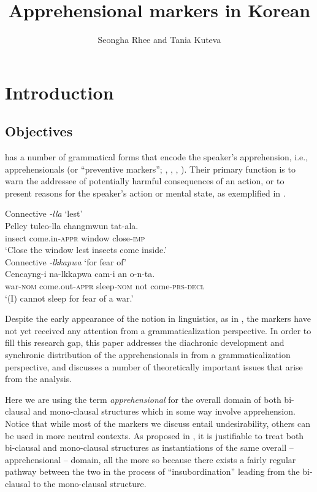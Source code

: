 \documentclass[output=paper,colorlinks,citecolor=brown]{langscibook}
\author{Seongha Rhee\affiliation{Mahidol University; Hankuk University of Foreign Studies} and Tania Kuteva\affiliation{Heinrich-Heine-Universität Düsseldorf; SOAS, University of London}}
\title{Apprehensional markers in Korean}
\begin{document}
\maketitle


\section{Introduction}
\label{sec:rhee:introduction}

\subsection{Objectives}
\label{subsec:objectives}

 has a number of grammatical forms that encode the speaker's apprehension, i.e., apprehensionals (or ``preventive markers''; \citealt{Ramstedt1997}, \citealt{Kim1960}, \citealt{Ko1989}, \citealt{Son1994}). Their primary function is to warn the addressee of potentially harmful consequences of an action, or to present reasons for the speaker's action or mental state, as exemplified in .


\ea \label{ex:RK1}
\ea \label{ex:RK1a} \textup{Connective} \textit{-lla} \textup{`lest'} \\
\gll Pelley tuleo-lla changmwun tat-ala. \\
insect come.in-\textsc{appr} window close-\textsc{imp} \\
\glt `Close the window lest insects come inside.' \\
\ex \label{ex:RK1b} \textup{Connective} \textit{-lkkapwa} \textup{`for fear of'} \\
\gll Cencayng-i na-lkkapwa cam-i an o-n-ta. \\
war-\textsc{nom} come.out-\textsc{appr} sleep-\textsc{nom} not come-\textsc{prs-decl} \\
\glt `(I) cannot sleep for fear of a war.'
\z
\z

 Despite the early appearance of the notion in  linguistics, as in \citet{Ramstedt1997}, the markers have not yet received any attention from a grammaticalization perspective. In order to fill this research gap, this paper addresses the diachronic development and synchronic distribution of the apprehensionals in  from a grammaticalization perspective, and discusses a number of theoretically important issues that arise from the analysis. 

Here we are using the term \textit{apprehensional} for the overall domain of both bi-clausal and mono-clausal structures which in some way involve apprehension. Notice that while most of the markers we discuss entail undesirability, others can be used in more neutral contexts. As proposed in \citet[865]{kutevaetal2019}, it is justifiable to treat both bi-clausal and mono-clausal structures as instantiations of the same overall -- apprehensional -- domain, all the more so because there exists a fairly regular pathway between the two in the process of ``insubordination'' \citep{evans2007,EvansWatanabe2016} leading from the bi-clausal to the mono-clausal structure.
\end{document}
